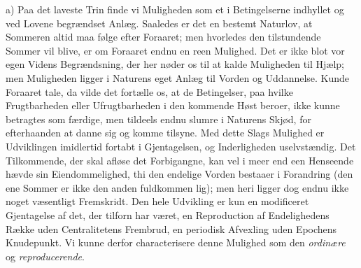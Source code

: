 \documentclass[12pt]{book}
\newcommand{\opage}[1]{\marginnote{\footnotesize\textit{[#1]}}}
\begin{document}
a) Paa det laveste Trin finde vi Muligheden som et i Betingelserne indhyllet og ved Lovene
begrændset Anlæg. Saaledes er det en bestemt Naturlov, at Sommeren altid
\opage{153} maa følge efter Foraaret; men hvorledes den tilstundende Sommer vil blive, er om Foraaret
endnu en reen Mulighed. Det er ikke blot vor egen Videns Begrændsning, der her nøder os til
at kalde Muligheden til Hjælp; men Muligheden ligger i Naturens eget Anlæg til Vorden og
Uddannelse. Kunde Foraaret tale, da vilde det fortælle os, at de Betingelser, paa hvilke
Frugtbarheden eller Ufrugtbarheden i den kommende Høst beroer, ikke kunne betragtes som
færdige, men tildeels endnu slumre i Naturens Skjød, for efterhaanden at danne sig og komme
tilsyne. Med dette Slags Mulighed er Udviklingen imidlertid fortabt i Gjentagelsen, og
Inderligheden uselvstændig. Det Tilkommende, der skal afløse det Forbigangne, kan vel i meer
end een Henseende hævde sin Eiendommelighed, thi den endelige Vorden bestaaer i Forandring
(den ene Sommer er ikke den anden fuldkommen lig); men heri ligger dog endnu ikke noget
væsentligt Fremskridt. Den hele Udvikling er kun en modificeret Gjentagelse af det, der
tilforn har været, en Reproduction af Endelighedens Række uden Centralitetens Frembrud, en
periodisk Afvexling uden Epochens Knudepunkt. Vi kunne derfor characterisere denne Mulighed
som den \emph{ordinære} og \emph{reproducerende}.
\end{document}
